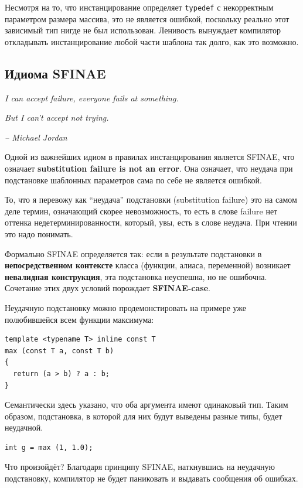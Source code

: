\documentclass[a4paper,12pt,oneside]{book}
\begin{document}
Несмотря на то, что инстанцирование определяет \lstinline!typedef! с некорректным параметром размера массива, это не является ошибкой, поскольку реально этот зависимый тип нигде не был использован. Ленивость вынуждает компилятор откладывать инстанцирование любой части шаблона так долго, как это возможно.

\pagebreak
\subsection{Идиома SFINAE}\label{SFINAE}

\hfill\textit{I can accept failure, everyone fails at something.}

\hfill\textit{But I can't accept not trying.}{\vspace{0.5em}}

\hfill\textit{-- Michael Jordan}

Одной из важнейших идиом в правилах инстанцирования является SFINAE, что означает \textbf{substitution failure is not an error}. Она означает, что неудача при подстановке шаблонных параметров сама по себе не является ошибкой.

То, что я перевожу как ``неудача'' подстановки (substitution failure) это на самом деле термин, означающий скорее невозможность, то есть в слове failure нет оттенка недетерминированности, который, увы, есть в слове неудача. При чтении это надо понимать. 

Формально SFINAE определяется так: если в результате подстановки в \textbf{непосредственном контексте} класса (функции, алиаса, переменной) возникает \textbf{невалидная конструкция}, эта подстановка неуспешна, но не ошибочна. Сочетание этих двух условий порождает \textbf{SFINAE-case}.

Неудачную подстановку можно продемонстировать на примере уже полюбившейся всем функции максимума:

\begin{lstlisting}
template <typename T> inline const T
max (const T a, const T b)
{
  return (a > b) ? a : b;
}
\end{lstlisting}

Семантически здесь указано, что оба аргумента имеют одинаковый тип. Таким образом, подстановка, в которой для них будут выведены разные типы, будет неудачной.

\begin{lstlisting}
int g = max (1, 1.0);
\end{lstlisting}

Что произойдёт? Благодаря принципу SFINAE, наткнувшись на неудачную подстановку, компилятор не будет паниковать и выдавать сообщения об ошибках. 
\end{document}
